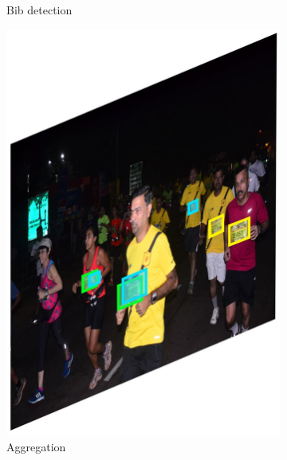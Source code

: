 \begin{landscape}
\begin{figure}[p]
\begin{subfigure}[b]{0.23\paperwidth}
      \caption{Bib detection}
      \label{fig:processing_pipeline:person_filtering:yolo_crop_bib_detection}
    \end{subfigure}
    \begin{subfigure}[b]{0.23\paperwidth}
      \includegraphics[width=\textwidth]{images/processing/yolo_crop_aggregated_detections}
      \caption{Aggregation}
      \label{fig:processing_pipeline:person_filtering:yolo_crop_aggregated_detections}
    \end{subfigure}
    \begin{subfigure}[b]{0.23\paperwidth}

\end{subfigure}
\end{figure}
\end{landscape}
